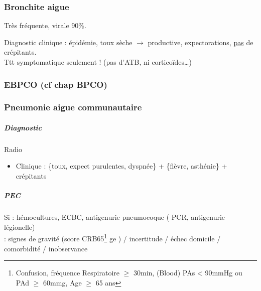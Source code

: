 \documentclass[11pt]{article}
\begin{document}
\subsubsection{Bronchite aigue}
\label{sec:orga8ebb9d}
Très fréquente, virale 90\%. 

Diagnostic clinique : épidémie, toux sèche \(\to\) productive, expectorations,
\uline{pas} de crépitants.\\

Ttt symptomatique seulement ! (pas d'ATB, ni corticoïdes\ldots{})

\subsubsection{EBPCO (cf chap BPCO)}
\label{sec:orgbf680d8}

\subsubsection{Pneumonie aigue communautaire}
\label{sec:org7ad1eb0}

\subparagraph{Diagnostic}
\label{sec:orgc48490c}
Radio
\begin{itemize}
\item Clinique : \{toux, expect purulentes, dyspnée\} + \{fièvre, asthénie\} + crépitants
\end{itemize}

\subparagraph{PEC}
\label{sec:org8a0a7c8}
Si \faHospital : hémocultures, ECBC, antigenurie pneumocoque (\textpm{} PCR,
antigenurie légionelle)\\
\faHospital : signes de gravité (score CRB65\footnote{Confusion, fréquence Respiratoire \(\ge\) 30min, (Blood) PAs < 90mmHg ou PAd \(\ge\) 60mmg, Age \(\ge\) 65 ans} ge  ) / incertitude / échec domicile / comorbidité / inobservance
\end{document}
